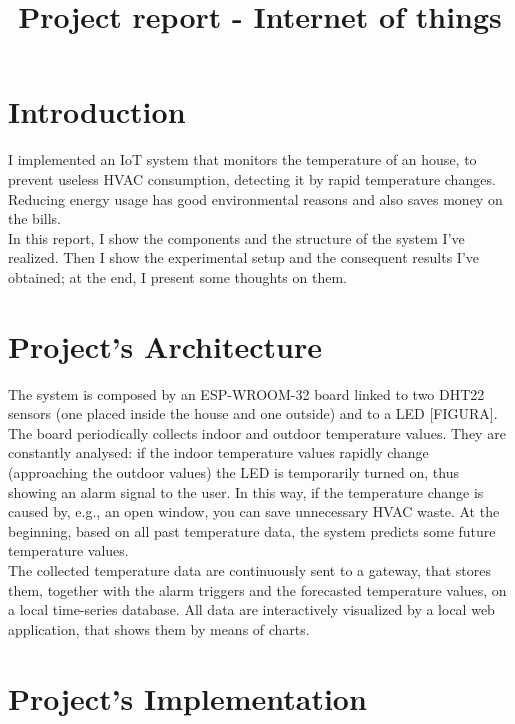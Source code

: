 \documentclass[conference]{IEEEtran}
\begin{document}
\title{Project report - Internet of things}

\author{
}

\maketitle


\section{Introduction}
I implemented an IoT system that monitors the temperature of an house, to prevent useless HVAC consumption, detecting it by rapid temperature changes. Reducing energy usage has good environmental reasons and also saves money on the bills.\\
In this report, I show the components and the structure of the system I've realized. Then I show the experimental setup and the consequent results I've obtained; at the end, I present some thoughts on them.


\section{Project’s Architecture}
The system is composed by an ESP-WROOM-32 board linked to two DHT22 sensors (one placed inside the house and one outside) and to a LED [FIGURA].\\
The board periodically collects indoor and outdoor temperature values. They are constantly analysed: if the indoor temperature values rapidly change (approaching the outdoor values) the LED is temporarily turned on, thus showing an alarm signal to the user. In this way, if the temperature change is caused by, e.g., an open window, you can save unnecessary HVAC waste. At the beginning, based on all past temperature data, the system predicts some future temperature values.\\
The collected temperature data are continuously sent to a gateway, that stores them, together with the alarm triggers and the forecasted temperature values, on a local time-series database. All data are interactively visualized by a local web application, that shows them by means of charts.


\section{Project’s Implementation}
\end{document}
